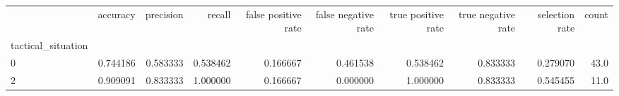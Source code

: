 \begin{tabular}{lrrrrrrrrr}
\toprule
{} &  accuracy &  precision &    recall &  false positive rate &  false negative rate &  true positive rate &  true negative rate &  selection rate &  count \\
tactical\_situation &           &            &           &                      &                      &                     &                     &                 &        \\
\midrule
0                  &  0.744186 &   0.583333 &  0.538462 &             0.166667 &             0.461538 &            0.538462 &            0.833333 &        0.279070 &   43.0 \\
2                  &  0.909091 &   0.833333 &  1.000000 &             0.166667 &             0.000000 &            1.000000 &            0.833333 &        0.545455 &   11.0 \\
\bottomrule
\end{tabular}
